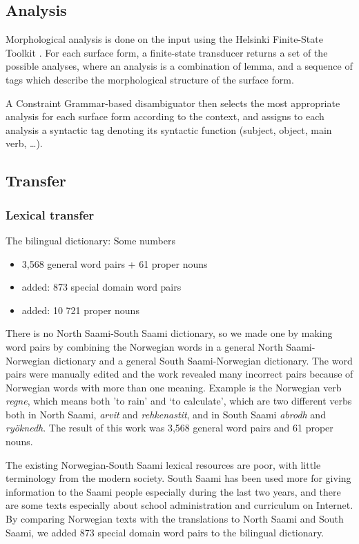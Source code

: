 \documentclass[a4paper,11pt,twocolumn]{article}
\begin{document}
\subsection{Analysis}

Morphological analysis is done on the input using the Helsinki Finite-State
Toolkit \cite{linden2011}. For each surface form, a finite-state transducer
returns a set of the possible analyses, where an analysis is a combination
of lemma, and a sequence of tags which describe the morphological structure
of the surface form.

A Constraint Grammar-based disambiguator then selects the most appropriate 
analysis for each surface form according to the context, and assigns to each 
analysis a syntactic tag denoting its syntactic function (subject, object, 
main verb, \ldots).

\subsection{Transfer}

\subsubsection{Lexical transfer}

The bilingual dictionary: Some numbers 

\begin{itemize}
\item 3,568 general word pairs + 61 proper nouns
\item added: 873 special domain word pairs 
\item added: 10 721 proper nouns
\end{itemize}

There is no North Saami-South Saami dictionary, so we made one by making word pairs by combining the Norwegian words in a general North Saami-Norwegian dictionary and a general South Saami-Norwegian dictionary. The word pairs were manually edited and the work revealed many incorrect pairs because of Norwegian words with more than one meaning. Example is the Norwegian verb \textit{regne}, which means both 'to rain' and ‘to calculate’, which are two different verbs both in North Saami, \textit{arvit} and \textit{rehkenastit}, and in South Saami \textit{abrodh} and \textit{ryöknedh}. The result of this work was 3,568 general word pairs and 61 proper nouns.

The existing Norwegian-South Saami lexical resources are poor, with little terminology from the modern society. South Saami has been used more for giving information to the Saami people especially during the last two years, and there are some texts especially about school administration and curriculum on Internet. By comparing Norwegian texts with the translations to North Saami and South Saami, we added 873 special domain word pairs to the bilingual dictionary.
\end{document}
